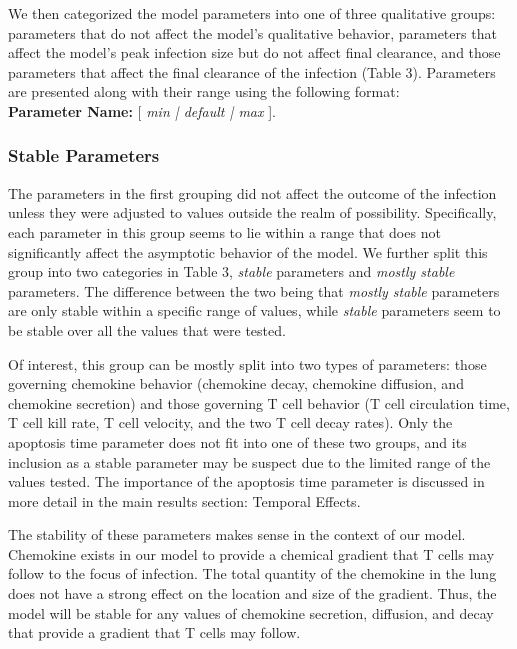 \documentclass[10pt]{article}
\begin{document}
We then categorized the model parameters into one of three qualitative groups: parameters that do not affect the model's qualitative behavior, parameters that affect the model's peak infection size but do not affect final clearance, and those parameters that affect the final clearance of the infection (Table 3).  Parameters are presented along with their range using the following format:  \\

\textbf{Parameter Name:} [ \textit{min | default | max} ].


\subsubsection{Stable Parameters}

The parameters in the first grouping did not affect the outcome of the infection unless they were adjusted to values outside the realm of possibility.  Specifically, each parameter in this group seems to lie within a range that does not significantly affect the asymptotic behavior of the model.  We further split this group into two categories in Table 3, \textit{stable} parameters and \textit{mostly stable} parameters.  The difference between the two being that \textit{mostly stable} parameters are only stable within a specific range of values, while \textit{stable} parameters seem to be stable over all the values that were tested.

Of interest, this group can be mostly split into two types of parameters: those governing chemokine behavior (chemokine decay, chemokine diffusion, and chemokine secretion) and those governing T cell behavior (T cell circulation time, T cell kill rate, T cell velocity, and the two T cell decay rates).  Only the apoptosis time parameter does not fit into one of these two groups, and its inclusion as a stable parameter may be suspect due to the limited range of the values tested.  The importance of the apoptosis time parameter is discussed in more detail in the main results section: Temporal Effects.  

The stability of these parameters makes sense in the context of our model.  Chemokine exists in our model to provide a chemical gradient that T cells may follow to the focus of infection.  The total quantity of the chemokine in the lung does not have a strong effect on the location and size of the gradient.  Thus, the model will be stable for any values of chemokine secretion, diffusion, and decay that provide a gradient that T cells may follow.
\end{document}
